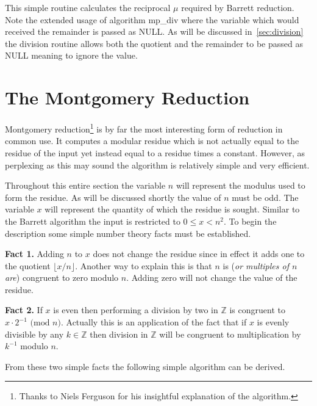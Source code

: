 \documentclass[b5paper]{book}
\def\Z{{\mathbb Z}}
\begin{document}
This simple routine calculates the reciprocal $\mu$ required by Barrett reduction.  Note the extended usage of algorithm mp\_div where the variable
which would received the remainder is passed as NULL.  As will be discussed in~\ref{sec:division} the division routine allows both the quotient and the 
remainder to be passed as NULL meaning to ignore the value.  

\section{The Montgomery Reduction}
Montgomery reduction\footnote{Thanks to Niels Ferguson for his insightful explanation of the algorithm.} \cite{MONT} is by far the most interesting 
form of reduction in common use.  It computes a modular residue which is not actually equal to the residue of the input yet instead equal to a 
residue times a constant.  However, as perplexing as this may sound the algorithm is relatively simple and very efficient.  

Throughout this entire section the variable $n$ will represent the modulus used to form the residue.  As will be discussed shortly the value of
$n$ must be odd.  The variable $x$ will represent the quantity of which the residue is sought.  Similar to the Barrett algorithm the input
is restricted to $0 \le x < n^2$.  To begin the description some simple number theory facts must be established.

\textbf{Fact 1.}  Adding $n$ to $x$ does not change the residue since in effect it adds one to the quotient $\lfloor x / n \rfloor$.  Another way
to explain this is that $n$ is (\textit{or multiples of $n$ are}) congruent to zero modulo $n$.  Adding zero will not change the value of the residue.  

\textbf{Fact 2.}  If $x$ is even then performing a division by two in $\Z$ is congruent to $x \cdot 2^{-1} \mbox{ (mod }n\mbox{)}$.  Actually
this is an application of the fact that if $x$ is evenly divisible by any $k \in \Z$ then division in $\Z$ will be congruent to 
multiplication by $k^{-1}$ modulo $n$.  

From these two simple facts the following simple algorithm can be derived.
\end{document}
